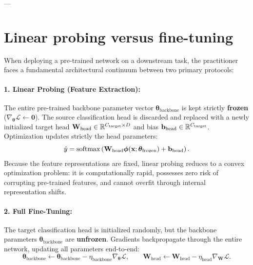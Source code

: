 ---

\section{Linear probing versus fine-tuning}
\label{sec:linear_probing_vs_finetuning}

When deploying a pre-trained network on a downstream task, the practitioner faces a fundamental architectural continuum between two primary protocols:

\paragraph{1. Linear Probing (Feature Extraction):}
The entire pre-trained backbone parameter vector $\boldsymbol{\theta}_{\text{backbone}}$ is kept strictly \textbf{frozen} ($\nabla_{\boldsymbol{\theta}} \mathcal{L} \leftarrow \mathbf{0}$). The source classification head is discarded and replaced with a newly initialized target head $\mathbf{W}_{\text{head}} \in \mathbb{R}^{C_{\text{target}} \times D}$ and bias $\mathbf{b}_{\text{head}} \in \mathbb{R}^{C_{\text{target}}}$. Optimization updates strictly the head parameters:
\begin{equation}
\hat{y} = \operatorname{softmax}\left( \mathbf{W}_{\text{head}} \boldsymbol{\phi}(\mathbf{x}; \boldsymbol{\theta}_{\text{frozen}}) + \mathbf{b}_{\text{head}} \right).
\label{eq:linear_probing_formulation}
\end{equation}
Because the feature representations are fixed, linear probing reduces to a convex optimization problem: it is computationally rapid, possesses zero risk of corrupting pre-trained features, and cannot overfit through internal representation shifts.

\paragraph{2. Full Fine-Tuning:}
The target classification head is initialized randomly, but the backbone parameters $\boldsymbol{\theta}_{\text{backbone}}$ are \textbf{unfrozen}. Gradients backpropagate through the entire network, updating all parameters end-to-end:
\begin{equation}
\boldsymbol{\theta}_{\text{backbone}} \leftarrow \boldsymbol{\theta}_{\text{backbone}} - \eta_{\text{backbone}} \nabla_{\boldsymbol{\theta}} \mathcal{L}, \qquad \mathbf{W}_{\text{head}} \leftarrow \mathbf{W}_{\text{head}} - \eta_{\text{head}} \nabla_{\mathbf{W}} \mathcal{L}.
\end{equation}

